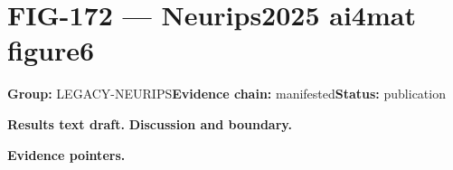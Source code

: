 \clearpage
\section{FIG-172 --- Neurips2025 ai4mat figure6}
\label{figpage:fig-172}
\textbf{Group:} LEGACY-NEURIPS\quad \textbf{Evidence chain:} manifested\quad \textbf{Status:} publication

\textbf{Results text draft.} 
\textbf{Discussion and boundary.} 


\textbf{Evidence pointers.}



\vfill
